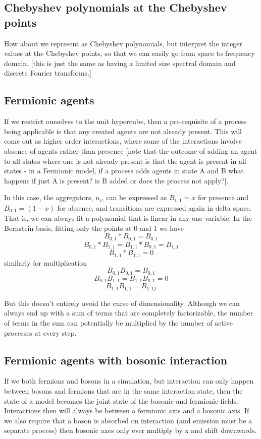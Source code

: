 \documentclass[a4paper]{article}
\begin{document}
\subsection{Chebyshev polynomials at the Chebyshev points}
How about we represent as Chebyshev polynomials, but interpret the integer values at the Chebyshev points, so that we can easily go from space to frequency domain. [this is just the same as having a limited size spectral domain and discrete Fourier transforms.]

\subsection{Fermionic agents}

If we restrict ourselves to the unit hypercube, then a pre-requisite of a process being applicable is that any created agents are not already present. This will come out as higher order interactions, where some of the interactions involve absence of agents rather than presence [note that the outcome of adding an agent to all states where one is not already present is that the agent is present in all states - in a Fermionic model, if a process adds agents in state A and B what happens if just A is present? is B added or does the process not apply?].

In this case, the aggregators, $n_i$, can be expressed as $B_{1,1}=x$ for presence and $B_{0,1}=(1-x)$ for absence, and transitions are expressed again in delta space. That is, we can always fit a polynomial that is linear in any one variable. In the Bernstein basis, fitting only the points at 0 and 1 we have 
\[
B_{0,1} \ast B_{0,1} = B_{0,1}
\]
\[B_{0,1} \ast B_{1,1} = B_{1,1} \ast B_{0,1} = B_{1,1}\]
\[
B_{1,1} \ast B_{1,1} = 0
\]
similarly for multiplication
\[
B_{0,1}B_{0,1} = B_{0,1}
\]
\[
B_{0,1}B_{1,1} = B_{1,1}B_{0,1} = 0
\]
\[
B_{1,1}B_{1,1} = B_{1,1f}
\]

But this doesn't entirely avoid the curse of dimensionality. Although we can always end up with a sum of terms that are completely factorizable, the number of terms in the sum can potentially be multiplied by the number of active processes at every step.

\subsection{Fermionic agents with bosonic interaction}

If we both fermions and bosons in a simulation, but interaction can only happen between bosons and fermions that are in the same interaction state, then the state of a model becomes the joint state of the bosonic and fermionic fields. Interactions then will always be between a fermionic axis and a bosonic axis. If we also require that a boson is absorbed on interaction (and emission must be a separate process) then bosonic axes only ever multiply by x and shift downwards.
\end{document}
